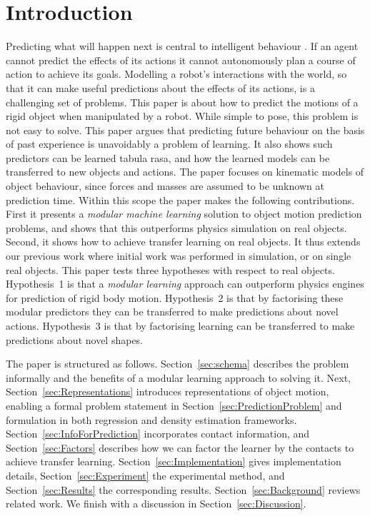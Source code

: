 \section{Introduction}\label{sec:Introduction}

Predicting what will happen next is central to intelligent behaviour \cite{craik1967nature}. If an agent cannot predict the effects of its actions it cannot autonomously plan a course of action to achieve its goals. Modelling a robot's interactions with the world, so that it can make useful predictions about the effects of its actions, is a challenging set of problems. This paper is about how to predict the motions of a rigid object when manipulated by a robot. While simple to pose, this problem is not easy to solve. This paper argues that predicting future behaviour on the basis of past experience is unavoidably a problem of learning. It also shows such predictors can be learned tabula rasa, and how the learned models can be transferred to new objects and actions. The paper focuses on kinematic models of object behaviour, since forces and masses are assumed to be unknown at prediction time. Within this scope the paper makes the following contributions. First it presents a {\em modular machine learning} solution to object motion prediction problems, and shows that this outperforms physics simulation on real objects.  Second, it shows how to achieve transfer learning on real objects. It thus extends our previous work \cite{kopicki_prediction_2009,kopicki_prediction_2010,kopicki-etal-icra11,moerwald11predicting}  where initial work was performed in simulation, or on single real objects.  This paper tests three hypotheses with respect to real objects. Hypothesis~1 is that a {\em modular learning} approach can outperform physics engines for prediction of rigid body motion.  Hypothesis~2 is that by factorising these modular predictors they can be transferred to make predictions about novel actions. Hypothesis~3 is that by factorising learning can be transferred  to make predictions about novel shapes.

The paper is structured as follows.  Section~\ref{sec:schema} describes the problem informally and the benefits of a modular learning approach to solving it. Next, Section~\ref{sec:Representations} introduces representations of object motion, enabling a formal problem statement in Section~\ref{sec:PredictionProblem} and formulation in both regression and density estimation frameworks. Section~\ref{sec:InfoForPrediction} incorporates contact information, and Section~\ref{sec:Factors} describes how we can factor the learner by the contacts to achieve transfer learning. Section~\ref{sec:Implementation} gives implementation details, Section~\ref{sec:Experiment} the experimental method, and Section~\ref{sec:Results}
the corresponding results. Section~\ref{sec:Background} reviews related work.  We finish with a discussion in Section~\ref{sec:Discussion}.